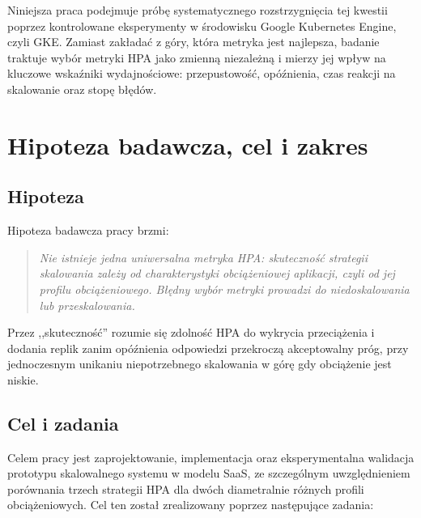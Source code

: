 Niniejsza praca podejmuje próbę systematycznego rozstrzygnięcia tej kwestii poprzez kontrolowane eksperymenty w środowisku Google Kubernetes Engine, czyli GKE. Zamiast zakładać z góry, która metryka jest najlepsza, badanie traktuje wybór metryki HPA jako zmienną niezależną i mierzy jej wpływ na kluczowe wskaźniki wydajnościowe: przepustowość, opóźnienia, czas reakcji na skalowanie oraz stopę błędów.

\section{Hipoteza badawcza, cel i zakres}

\subsection{Hipoteza}

Hipoteza badawcza pracy brzmi:

\begin{quote}
\textit{Nie istnieje jedna uniwersalna metryka HPA: skuteczność strategii skalowania zależy od charakterystyki obciążeniowej aplikacji, czyli od jej profilu obciążeniowego. Błędny wybór metryki prowadzi do niedoskalowania lub przeskalowania.}
\end{quote}

Przez ,,skuteczność'' rozumie się zdolność HPA do wykrycia przeciążenia i dodania replik zanim opóźnienia odpowiedzi przekroczą akceptowalny próg, przy jednoczesnym unikaniu niepotrzebnego skalowania w górę gdy obciążenie jest niskie.

\subsection{Cel i zadania}

Celem pracy jest zaprojektowanie, implementacja oraz eksperymentalna walidacja prototypu skalowalnego systemu w modelu SaaS, ze szczególnym uwzględnieniem porównania trzech strategii HPA dla dwóch diametralnie różnych profili obciążeniowych. Cel ten został zrealizowany poprzez następujące zadania:

